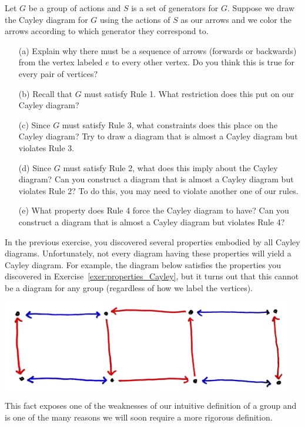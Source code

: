 \begin{exercise}\label{exer:properties_Cayley}
Let $G$ be a group of actions and $S$ is a set of generators for $G$. Suppose we draw the Cayley diagram for $G$ using the actions of $S$ as our arrows and we color the arrows according to which generator they correspond to.  
\begin{enumerate}
\item[(a)] Explain why there must be a sequence of arrows (forwards or backwards) from the vertex labeled $e$ to every other vertex.  Do you think this is true for every pair of vertices?
\item[(b)] Recall that $G$ must satisfy Rule 1.  What restriction does this put on our Cayley diagram?
\item[(c)] Since $G$ must satisfy Rule 3, what constraints does this place on the Cayley diagram?  Try to draw a diagram that is almost a Cayley diagram but violates Rule 3.
\item[(d)] Since $G$ must satisfy Rule 2, what does this imply about the Cayley diagram?  Can you construct a diagram that is almost a Cayley diagram but violates Rule 2?  To do this, you may need to violate another one of our rules.
\item[(e)] What property does Rule 4 force the Cayley diagram to have?  Can you construct a diagram that is almost a Cayley diagram but violates Rule 4? 
\end{enumerate}
\end{exercise}

In the previous exercise, you discovered several properties embodied by all Cayley diagrams. Unfortunately, not every diagram having these properties will yield a Cayley diagram.  For example, the diagram below satisfies the properties you discovered in Exercise~\ref{exer:properties_Cayley}, but it turns out that this cannot be a diagram for any group (regardless of how we label the vertices).

\begin{center}
\includegraphics[width=5in]{nonregular.png}
\end{center}

This fact exposes one of the weaknesses of our intuitive definition of a group and is one of the many reasons we will soon require a more rigorous definition.